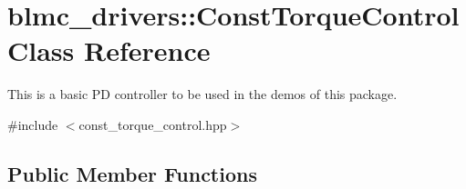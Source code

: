 \hypertarget{classblmc__drivers_1_1ConstTorqueControl}{}\section{blmc\+\_\+drivers\+:\+:Const\+Torque\+Control Class Reference}
\label{classblmc__drivers_1_1ConstTorqueControl}


This is a basic PD controller to be used in the demos of this package.  




{\ttfamily \#include $<$const\+\_\+torque\+\_\+control.\+hpp$>$}

\subsection*{Public Member Functions}
